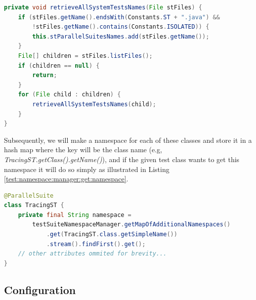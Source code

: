\begin{lstlisting}[language=Java,label=test:namespace:manager:list:files,caption=Dynamically list all @ParallelSuites,frame=tb]
private void retrieveAllSystemTestsNames(File stFiles) {
    if (stFiles.getName().endsWith(Constants.ST + ".java") &&
        !stFiles.getName().contains(Constants.ISOLATED)) {
        this.stParallelSuitesNames.add(stFiles.getName());
    }
    File[] children = stFiles.listFiles();
    if (children == null) {
        return;
    }
    for (File child : children) {
        retrieveAllSystemTestsNames(child);
    }
}
\end{lstlisting}
Subsequently, we will make a namespace for each of these classes and store it in a hash map where the key will be the class name
(e.g, \emph{TracingST.getClass().getName()}), and if the given test class wants to get this namespace it will do so simply as
illustrated in Listing \ref{test:namespace:manager:get:namespace}.

\begin{lstlisting}[language=Java,label=test:namespace:manager:get:namespace,caption=@ParallelSuite query generated (dynamically) namespace,frame=tb]
@ParallelSuite
class TracingST {
    private final String namespace =
        testSuiteNamespaceManager.getMapOfAdditionalNamespaces()
            .get(TracingST.class.getSimpleName())
            .stream().findFirst().get();
    // other attributes ommited for brevity...
}
\end{lstlisting}

\subsection{Configuration}
\label{05:class:wide:config}

